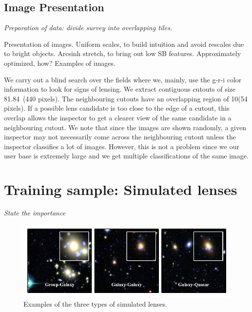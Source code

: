 \documentclass[useAMS,usenatbib,a4paper]{mn2e}
\begin{document}
\subsection{Image Presentation}
\label{sec:data:impres}
{\it Preparation of data: divide survey into overlapping tiles. 

Presentation of images. Uniform scales, to build intuition and avoid rescales
due to bright objects. Arcsinh stretch, to bring out low SB features. 
Approximately optimized, how? Examples of images.}

We carry out a blind search over the \cfhtls fields where we, mainly, use
the g-r-i color information to look for signs of lensing. We extract
contiguous cutouts of size 81.84\arcsec\ (440 pixels). The neighbouring
cutouts have an overlapping region of 10\arcsec (54 pixels). If a
possible lens candidate is too close to the edge of a cutout, this
overlap allows the inspector to get a clearer view of the same candidate
in a neighbouring cutout. We note that since the images are shown
randomly, a given inspector may not necessarily come across the
neighbouring cutout unless the inspector classifies a lot of images.
However, this is not a problem since we our user base is extremely large
and we get multiple classifications of the same image.



\section{Training sample: Simulated lenses}
\label{sec:ts}

{\it State the importance}

\begin{figure}
\begin{center}
\includegraphics[scale=1.0]{sw-cfhtls-figs/sim_cgq.pdf}
\caption{ \label{fig:sim}
Examples of the three types of simulated lenses.
}
\end{center}
\end{figure}
\end{document}

